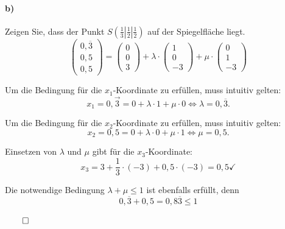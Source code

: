 \documentclass{ajc}
\numberwithin{equation}{subsection}
\begin{document}
	\paragraph{b)} Zeigen Sie, dass der Punkt $S(\frac{1}{3}|\frac{1}{2}|\frac{1}{2})$ auf der Spiegelfläche liegt.
	\begin{equation}
		\left(\begin{array}{r} 0,\overline{3} \\ 0,5 \\ 0,5\end{array}\right) = \left(\begin{array}{r} 0 \\ 0 \\ 3\end{array}\right) + \lambda \cdot \left(\begin{array}{r} 1 \\ 0 \\ -3\end{array}\right) + \mu \cdot \left(\begin{array}{r} 0 \\ 1 \\ -3\end{array}\right)
	\end{equation}
	
	Um die Bedingung für die $x_1$-Koordinate zu erfüllen, muss intuitiv gelten:
	\begin{equation}
		x_1 = 0,\overrightarrow{3} = 0 + \lambda \cdot 1 + \mu \cdot 0 \Leftrightarrow \lambda = 0,\overline{3}.
	\end{equation}
	
	Um die Bedingung für die $x_2$-Koordinate zu erfüllen, muss intuitiv gelten:
	\begin{equation}
		x_2 = 0,5 = 0 + \lambda \cdot 0 + \mu \cdot 1 \Leftrightarrow \mu = 0,5.
	\end{equation}
	
	Einsetzen von $\lambda$ und $\mu$ gibt für die $x_3$-Koordinate:
	\begin{equation}
		x_3 = 3 + \frac{1}{3} \cdot (-3) + 0,5 \cdot (-3) = 0,5 \checkmark
	\end{equation}
	
	Die notwendige Bedingung $\lambda + \mu \leq 1$ ist ebenfalls erfüllt, denn
	\begin{equation}
		0,\overline{3} + 0,5 = 0,8\overline{3} \leq 1
	\end{equation}
	
	$\qed$
	
\end{document}
